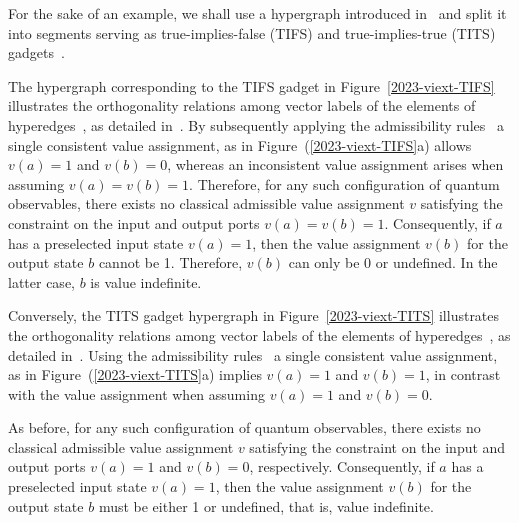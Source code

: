 \documentclass[%
 reprint,
 superscriptaddress,
 showpacs,
 showkeys,
 nofootinbib,
  amsmath,amssymb,
 pra,
  longbibliography,
  floatfix,
 ]{revtex4-2}
\theoremstyle{definition}
\begin{document}
\medskip

For the sake of an example, we shall use a hypergraph introduced in~\cite{2015-AnalyticKS}
and split it into segments serving as true-implies-false (TIFS) and true-implies-true (TITS) gadgets~\cite{2018-minimalYIYS}.


The hypergraph corresponding to the TIFS gadget  in Figure~\ref{2023-viext-TIFS}
illustrates the orthogonality relations among vector labels of the elements of hyperedges~\cite{lovasz-79}, as detailed in~\cite[Table~I]{2018-minimalYIYS}.
By subsequently applying the admissibility rules~\cite[Figure~(24.2.a)]{Svozil-2018-p} a single consistent value assignment,
as in Figure~(\ref{2023-viext-TIFS}a) allows $v(a)=1$ and $v(b)=0$, whereas
an inconsistent value assignment arises when assuming $v(a)=v(b)=1$.
Therefore, for any such configuration of quantum observables, there exists no classical admissible value assignment $v$
satisfying the constraint on the input and output ports $v(a)=v(b)=1$.
Consequently, if $a$ has a preselected input state $v(a)=1$, then
the value assignment $v(b)$ for the output state $b$ cannot be 1.
Therefore, $v(b)$ can only be 0 or undefined.
In the latter case, $b$
is value indefinite.




Conversely, the TITS gadget hypergraph in Figure~\ref{2023-viext-TITS}
illustrates the orthogonality relations among vector labels of the elements of hyperedges~\cite{lovasz-79}, as detailed in~\cite[Table~I]{2018-minimalYIYS}.
Using the admissibility rules~\cite[Fig.~(24.2.a)]{Svozil-2018-p} a single consistent value assignment,
as in Figure~(\ref{2023-viext-TITS}a) implies $v(a)=1$ and $v(b)=1$, in contrast with
the value assignment  when assuming $v(a)=1$ and $v(b)=0$.

As before, for any such configuration of quantum observables, there exists no classical admissible value assignment $v$
satisfying the constraint on the input and output ports $v(a)=1$ and $v(b)=0$, respectively.
Consequently, if $a$ has a preselected input state $v(a)=1$, then the value assignment $v(b)$ for the output state $b$ must be either 1 or undefined,
that is, value indefinite.
\end{document}

